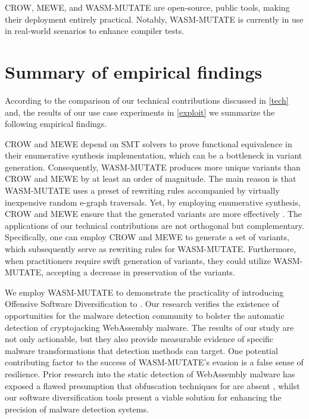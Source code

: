 CROW, MEWE, and WASM-MUTATE are open-source, public tools, making their deployment entirely practical. 
Notably, WASM-MUTATE is currently in use in real-world scenarios to enhance \Wasm compiler tests.

\section{Summary of empirical findings}

According to the comparison of our technical contributions discussed in \autoref{tech} and, the results of our use case experiments in \autoref{exploit} we summarize the following empirical findings.

\begin{strategy}
    CROW and MEWE depend on SMT solvers to prove functional equivalence in their enumerative synthesis implementation, which can be a bottleneck in variant generation. 
    Consequently, WASM-MUTATE produces more unique variants than CROW and MEWE by at least an order of magnitude. 
    The main reason is that WASM-MUTATE uses a preset of rewriting rules accompanied by virtually inexpensive random e-graph traversals.
    Yet, by employing enumerative synthesis, CROW and MEWE ensure that the generated variants are more effectively .
    The applications of our technical contributions are not orthogonal but complementary. 
    Specifically, one can employ CROW and MEWE to generate a set of variants, which subsequently serve as rewriting rules for WASM-MUTATE. 
    Furthermore, when practitioners require swift generation of variants, they could utilize WASM-MUTATE, accepting a decrease in preservation of the variants.
\end{strategy}


\begin{strategy}
    We employ WASM-MUTATE to demonstrate the practicality of introducing Offensive Software Diversification to \Wasm. 
    Our research verifies the existence of opportunities for the malware detection community to bolster the automatic detection of cryptojacking WebAssembly malware. 
    The results of our study are not only actionable, but they also provide measurable evidence of specific malware transformations that detection methods can target. 
    One potential contributing factor to the success of WASM-MUTATE's evasion is a false sense of resilience. 
    Prior research into the static detection of WebAssembly malware has exposed a flawed presumption that obfuscation techniques for \Wasm are absent \cite{Minesweeper, MinerRay, SEISMIC, RAPID, MINOS}, whilst our software diversification tools present a viable solution for enhancing the precision of \Wasm malware detection systems.
\end{strategy}

